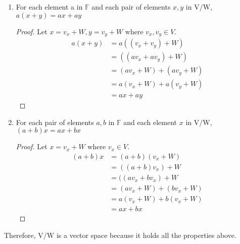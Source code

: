 \documentclass[11pt]{scrartcl}
\begin{document}
\begin{enumerate}[label=\alph*.]
{\begin{enumerate}[label=VS \arabic*:]
{\begin{proof}
			            \begin{align*}
				            (a b) x & = abv_x + W  \\
				                    & =a(bv_x + W) \\
				                    & =a(bx)
			            \end{align*}
		            \end{proof}
		            }
		      \item{
		            For each element a in $\mathbb{F}$ and each pair of elements $x, y$ in $\mathrm{V}/\mathrm{W}$, $a(x+y)=a x+a y$
		            \begin{proof}
			            Let $x = v_x + W, y = v_y + W$ where $v_x,v_y \in V$.
			            \begin{align*}
				            a(x + y) & = a((v_x + v_y) + W)       \\
				                     & =((av_x + av_y) + W )      \\
				                     & =(av_x + W ) +  (av_y + W) \\
				                     & =a(v_x + W ) + a(v_y + W)  \\
				                     & =ax +ay
			            \end{align*}
		            \end{proof}
		            }
		      \item{
		            For each pair of elements $a, b$ in $\mathbb{F}$ and each element $x$ in $\mathrm{V}/\mathrm{W}$, $(a+b) x=a x+b x$
		            \begin{proof}
			            Let $x = v_x + W$ where $v_x \in V$.
			            \begin{align*}
				            (a + b)x & = (a + b)(v_x + W)         \\
				                     & = ((a + b)v_x) + W         \\
				                     & = ((av_x + bv_x) + W       \\
				                     & = (av_x + W) +  (bv_x + W) \\
				                     & = a(v_x + W) + b(v_x + W)  \\
				                     & = ax + bx
			            \end{align*}
		            \end{proof}
		            }
	      \end{enumerate}
	      Therefore, $\mathrm{V}/\mathrm{W}$ is a vector space because it holds all the properties above.
	      }


\end{enumerate}
\end{document}
